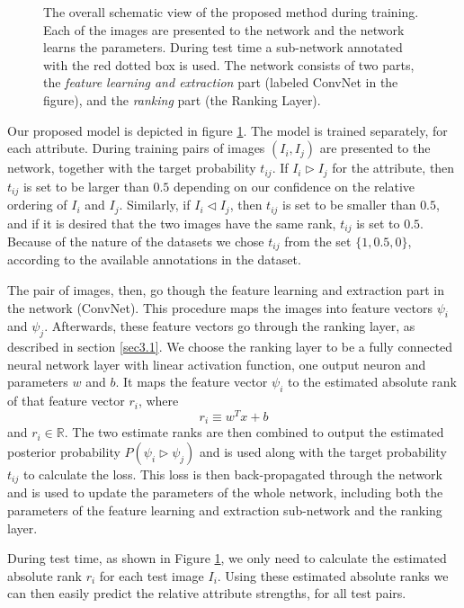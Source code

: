 \begin{figure}
{}
\caption{The overall schematic view of the proposed method during training. Each of the images are presented to the network and the network learns the parameters. During test time a sub-network annotated with the red dotted box is used. The network consists of two parts, the \textit{feature learning and extraction} part (labeled ConvNet in the figure), and the \textit{ranking} part (the Ranking Layer).}
\label{fig.3}
\end{figure}

Our proposed model is depicted in figure \ref{fig.3}. The model is trained separately, for each attribute. During training pairs of images $(I_i, I_j)$ are presented to the network, together with the target probability $t_{ij}$. If $I_i \triangleright I_j$ for the attribute, then $t_{ij}$ is  set to be larger than $0.5$ depending on our confidence on the relative ordering of $I_i$ and $I_j$. Similarly, if $I_i \triangleleft I_j$, then $t_{ij}$ is set to be smaller than $0.5$, and if it is desired that the two images have the same rank, $t_{ij}$ is set to $0.5$. Because of the nature of the datasets we chose $t_{ij}$ from the set $\{1, 0.5, 0 \}$, according to the available annotations in the dataset.

The pair of images, then, go though the feature learning and extraction part in the network (ConvNet). This procedure maps the images into feature vectors $\psi_i$ and $\psi_j$. Afterwards, these feature vectors go through the ranking layer, as described in section \ref{sec3.1}. We choose the ranking layer to be a fully connected neural network layer with linear activation function, one output neuron and parameters $w$ and $b$. It maps the feature vector $\psi_i$ to the estimated absolute rank of that feature vector $r_i$, where
$$
r_i \equiv w^T x + b
$$
and $r_i \in \mathbb{R}$.
The two estimate ranks are then combined to output the estimated posterior probability $P(\psi_i \triangleright \psi_j)$ and is used along with the target probability $t_{ij}$ to calculate the loss. This loss is then back-propagated through the network and is used to update the parameters of the whole network, including both the parameters of the feature learning and extraction sub-network and the ranking layer.

During test time, as shown in Figure \ref{fig.3}, we only need to calculate the estimated absolute rank $r_i$ for each test image $I_i$. Using these estimated absolute ranks we can then easily predict the relative attribute strengths, for all test pairs.